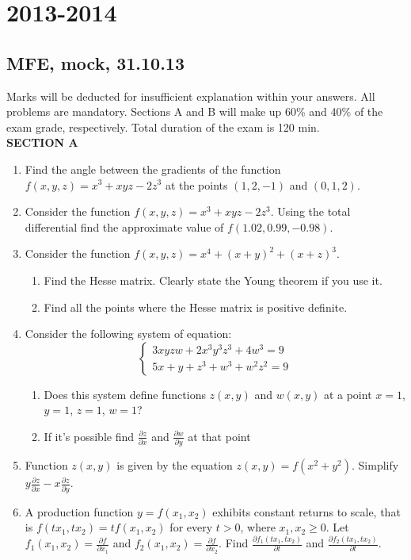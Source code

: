 \documentclass[12pt]{article} %
\theoremstyle{definition} %
\begin{document}
\section{2013-2014}

\subsection{MFE, mock, 31.10.13}

Marks will be deducted for insufficient explanation within your answers. All problems are mandatory. Sections A and B will make up 60\% and 40\% of the exam grade, respectively. Total duration of the exam is 120 min. \\

\textbf{SECTION A}

\begin{enumerate}

\item Find the angle between the gradients of the function $f(x,y,z)=x^3+xyz-2z^3$ at the points $(1,2,-1)$ and $(0,1,2)$.

\item Consider the function $f(x,y,z)=x^3+xyz-2z^3$. Using the total differential find the approximate value of $f(1.02,0.99,-0.98)$.

\item Consider the function $f(x,y,z)=x^4+(x+y)^2+(x+z)^3$.
\begin{enumerate}
\item Find the Hesse matrix. Clearly state the Young theorem if you use it.
\item Find all the points where the Hesse matrix is positive definite.
\end{enumerate}

\item Consider the following system of equation:
\[
\begin{cases}
3xyzw+2x^3y^3z^3+4w^3=9\\
5x+y+z^3+w^3+w^2z^2=9
\end{cases}
\]
\begin{enumerate}
\item Does this system define functions $z(x,y)$ and $w(x,y)$ at a point $x=1$, $y=1$, $z=1$, $w=1$?
\item If it's possible find $\frac{\partial z}{\partial x}$ and $\frac{\partial w}{\partial y}$ at that point
\end{enumerate}

\item Function $z(x,y)$ is given by the equation $z(x,y)=f(x^2+y^2)$. Simplify $y\frac{\partial z}{\partial x}-x\frac{\partial z}{\partial y}$.

\item A production function $y=f(x_1,x_2)$ exhibits constant returns to scale, that is $f(tx_1,tx_2)=tf(x_1,x_2)$ for every $t>0$, where $x_1, x_2 \geq 0$. Let $f_1(x_1,x_2)=\frac{\partial f}{\partial x_1}$ and $f_2(x_1,x_2)=\frac{\partial f}{\partial x_2}$. Find $\frac{\partial f_1(tx_1,tx_2)}{\partial t}$ and $\frac{\partial f_2(tx_1,tx_2)}{\partial t}$.

\end{enumerate}
\end{document}
